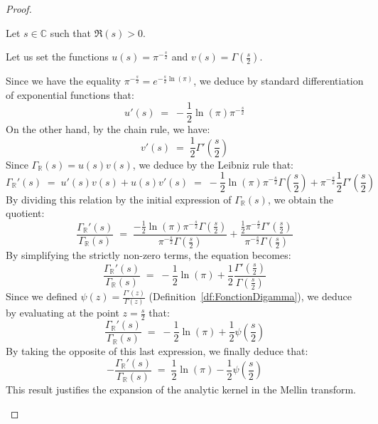 \documentclass[Riemann_Hypothesis.tex]{subfiles}
\begin{document}
\begin{proof}
    \begin{part_proof}
        Let $s \in \mathbb{C}$ such that $\Re(s) > 0$. \par
        Let us set the functions $u(s) = \pi^{-\frac{s}{2}}$ and $v(s) = \Gamma\left(\frac{s}{2}\right)$. \par
        Since we have the equality $\pi^{-\frac{s}{2}} = e^{-\frac{s}{2} \ln(\pi)}$, we deduce by standard differentiation of exponential functions that:
        \begin{equation*}
            u'(s) \;=\; -\frac{1}{2}\ln(\pi) \pi^{-\frac{s}{2}}
        \end{equation*}
        On the other hand, by the chain rule, we have:
        \begin{equation*}
            v'(s) \;=\; \frac{1}{2} \Gamma'\left(\frac{s}{2}\right)
        \end{equation*}
        Since $\Gamma_{\mathbb{R}}(s) = u(s)v(s)$, we deduce by the Leibniz rule that:
        \begin{equation*}
            \Gamma_{\mathbb{R}}'(s) \;=\; u'(s)v(s) + u(s)v'(s) \;=\; -\frac{1}{2}\ln(\pi) \pi^{-\frac{s}{2}} \Gamma\left(\frac{s}{2}\right) + \pi^{-\frac{s}{2}} \frac{1}{2} \Gamma'\left(\frac{s}{2}\right)
        \end{equation*}
        By dividing this relation by the initial expression of $\Gamma_{\mathbb{R}}(s)$, we obtain the quotient:
        \begin{equation*}
            \frac{\Gamma_{\mathbb{R}}'(s)}{\Gamma_{\mathbb{R}}(s)} \;=\; \frac{-\frac{1}{2}\ln(\pi) \pi^{-\frac{s}{2}} \Gamma\left(\frac{s}{2}\right)}{\pi^{-\frac{s}{2}} \Gamma\left(\frac{s}{2}\right)} + \frac{\frac{1}{2} \pi^{-\frac{s}{2}} \Gamma'\left(\frac{s}{2}\right)}{\pi^{-\frac{s}{2}} \Gamma\left(\frac{s}{2}\right)}
        \end{equation*}
        By simplifying the strictly non-zero terms, the equation becomes:
        \begin{equation*}
            \frac{\Gamma_{\mathbb{R}}'(s)}{\Gamma_{\mathbb{R}}(s)} \;=\; -\frac{1}{2}\ln(\pi) + \frac{1}{2} \frac{\Gamma'\left(\frac{s}{2}\right)}{\Gamma\left(\frac{s}{2}\right)}
        \end{equation*}
        Since we defined $\psi(z) = \frac{\Gamma'(z)}{\Gamma(z)}$ (Definition~\ref{df:FonctionDigamma}), we deduce by evaluating at the point $z = \frac{s}{2}$ that:
        \begin{equation*}
            \frac{\Gamma_{\mathbb{R}}'(s)}{\Gamma_{\mathbb{R}}(s)} \;=\; -\frac{1}{2}\ln(\pi) + \frac{1}{2}\psi\left(\frac{s}{2}\right)
        \end{equation*}
        By taking the opposite of this last expression, we finally deduce that:
        \begin{equation*}
            -\frac{\Gamma_{\mathbb{R}}'(s)}{\Gamma_{\mathbb{R}}(s)} \;=\; \frac{1}{2}\ln(\pi) - \frac{1}{2}\psi\left(\frac{s}{2}\right)
        \end{equation*}
        This result justifies the expansion of the analytic kernel in the Mellin transform.
    \end{part_proof}
\end{proof}
\end{document}

